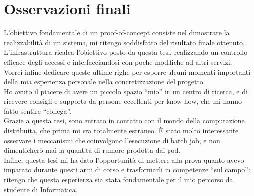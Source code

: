\section{Osservazioni finali}
L'obiettivo fondamentale di un proof-of-concept consiste nel dimostrare la realizzabilità 
di un sistema, mi ritengo soddisfatto del risultato finale ottenuto. L'infrastruttura ricalca l'obiettivo 
posto da questa tesi, realizzando un controllo efficace degli accessi e interfacciandosi 
con poche modifiche ad altri servizi.  
\\Vorrei infine dedicare queste ultime righe per esporre alcuni momenti importanti della mia esperienza personale nella concretizzazione del progetto. 
\\ Ho avuto il piacere di avere un piccolo spazio “mio” in un centro di ricerca, e di ricevere consigli e supporto da persone eccellenti per know-how, che mi hanno fatto sentire “collega”.
\\ Grazie a questa tesi, sono entrato in contatto con il mondo della computazione distribuita, che prima mi era totalmente estraneo. 
È stato molto interessante osservare i meccanismi che coinvolgono l'esecuzione di batch job, e non dimenticherò mai 
la quantità di rumore prodotta dai pod.   
\\ Infine, questa tesi mi ha dato l'opportunità di mettere alla prova quanto avevo
imparato durante questi anni di corso e trasformarli in competenze “sul campo”:
 ritengo che questa esperienza sia stata fondamentale per il mio percorso da studente di Informatica.  